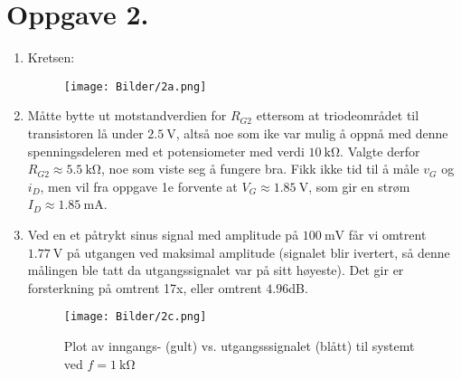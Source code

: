 \documentclass[a4paper,11pt,norsk]{article}
\begin{document}
\section*{Oppgave 2.}
\begin{enumerate}
    \item Kretsen: 
        \begin{figure}[H]
            \centering
            \texttt{[image: Bilder/2a.png]} 
        \end{figure}
    \item Måtte bytte ut motstandverdien for $R_{G2}$ ettersom at triodeområdet til transistoren lå under $\SI{2.5}{\volt}$, altså noe som ike var mulig å oppnå med 
        denne spenningsdeleren med et potensiometer med verdi $\SI{10}{\kilo\ohm}$. Valgte derfor $R_{G2} \approx \SI{5.5}{\kilo\ohm}$, noe som viste seg å fungere bra.
        Fikk ikke tid til å måle $v_G$ og $i_D$, men vil fra oppgave 1e forvente at $V_G \approx \SI{1.85}{\volt}$, som gir en strøm $I_D \approx \SI{1.85}{\milli\ampere}$.
    \item Ved en et påtrykt sinus signal med amplitude på $\SI{100}{\milli\volt}$ får vi omtrent $\SI{1.77}{\volt}$ på utgangen ved maksimal amplitude (signalet blir ivertert, så denne målingen 
        ble tatt da utgangssignalet var på sitt høyeste). Det gir er forsterkning på omtrent 17x, eller omtrent $4.96$dB.
        \begin{figure}[H]
            \centering
            \texttt{[image: Bilder/2c.png]}
            \caption{Plot av inngangs- (gult) vs. utgangsssignalet (blått) til systemt ved $f = \SI{1}{\kilo\ohm}$}
        \end{figure}
\end{enumerate}
\end{document}
